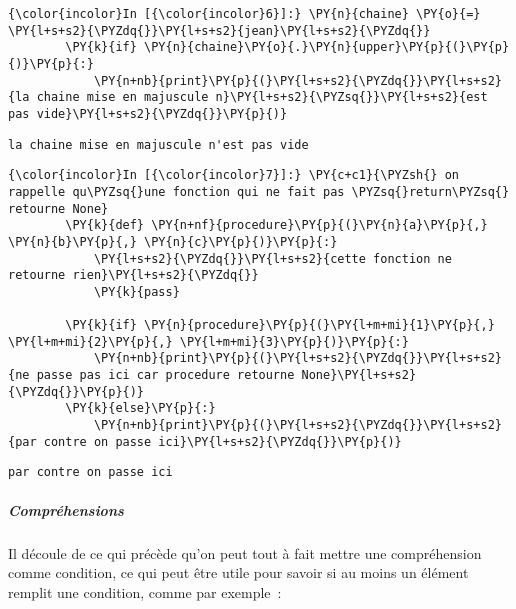     \begin{Verbatim}[commandchars=\\\{\},frame=single,framerule=0.3mm,rulecolor=\color{cellframecolor}]
{\color{incolor}In [{\color{incolor}6}]:} \PY{n}{chaine} \PY{o}{=} \PY{l+s+s2}{\PYZdq{}}\PY{l+s+s2}{jean}\PY{l+s+s2}{\PYZdq{}}
        \PY{k}{if} \PY{n}{chaine}\PY{o}{.}\PY{n}{upper}\PY{p}{(}\PY{p}{)}\PY{p}{:}
            \PY{n+nb}{print}\PY{p}{(}\PY{l+s+s2}{\PYZdq{}}\PY{l+s+s2}{la chaine mise en majuscule n}\PY{l+s+s2}{\PYZsq{}}\PY{l+s+s2}{est pas vide}\PY{l+s+s2}{\PYZdq{}}\PY{p}{)}
\end{Verbatim}


    \begin{Verbatim}[commandchars=\\\{\},frame=single,framerule=0.3mm,rulecolor=\color{cellframecolor}]
la chaine mise en majuscule n'est pas vide
\end{Verbatim}

    \begin{Verbatim}[commandchars=\\\{\},frame=single,framerule=0.3mm,rulecolor=\color{cellframecolor}]
{\color{incolor}In [{\color{incolor}7}]:} \PY{c+c1}{\PYZsh{} on rappelle qu\PYZsq{}une fonction qui ne fait pas \PYZsq{}return\PYZsq{} retourne None}
        \PY{k}{def} \PY{n+nf}{procedure}\PY{p}{(}\PY{n}{a}\PY{p}{,} \PY{n}{b}\PY{p}{,} \PY{n}{c}\PY{p}{)}\PY{p}{:}
            \PY{l+s+s2}{\PYZdq{}}\PY{l+s+s2}{cette fonction ne retourne rien}\PY{l+s+s2}{\PYZdq{}}
            \PY{k}{pass}
        
        \PY{k}{if} \PY{n}{procedure}\PY{p}{(}\PY{l+m+mi}{1}\PY{p}{,} \PY{l+m+mi}{2}\PY{p}{,} \PY{l+m+mi}{3}\PY{p}{)}\PY{p}{:}
            \PY{n+nb}{print}\PY{p}{(}\PY{l+s+s2}{\PYZdq{}}\PY{l+s+s2}{ne passe pas ici car procedure retourne None}\PY{l+s+s2}{\PYZdq{}}\PY{p}{)}
        \PY{k}{else}\PY{p}{:}
            \PY{n+nb}{print}\PY{p}{(}\PY{l+s+s2}{\PYZdq{}}\PY{l+s+s2}{par contre on passe ici}\PY{l+s+s2}{\PYZdq{}}\PY{p}{)}
\end{Verbatim}


    \begin{Verbatim}[commandchars=\\\{\},frame=single,framerule=0.3mm,rulecolor=\color{cellframecolor}]
par contre on passe ici
\end{Verbatim}

    \hypertarget{compruxe9hensions}{%
\subparagraph{Compréhensions}\label{compruxe9hensions}}

    Il découle de ce qui précède qu'on peut tout à fait mettre une
compréhension comme condition, ce qui peut être utile pour savoir si au
moins un élément remplit une condition, comme par exemple~:


